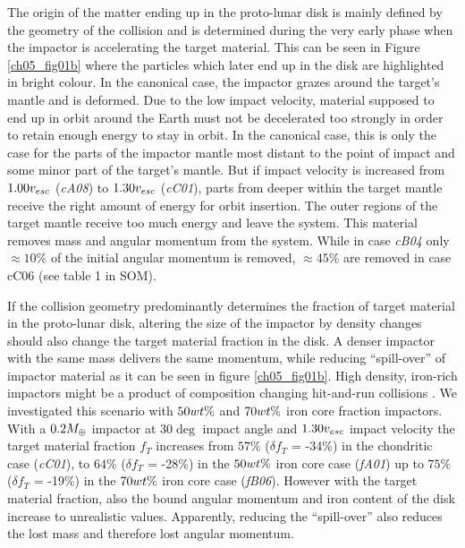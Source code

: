 The origin of the matter ending up in the proto-lunar disk is mainly defined by the geometry of the collision and is determined during the very early phase when the impactor is accelerating the target material. This can be seen in Figure \ref{ch05_fig01b} where the particles which later end up in the disk are highlighted in bright colour. In the canonical case, the impactor grazes around the target's mantle and is deformed. Due to the low impact velocity, material supposed to end up in orbit around the Earth must not be decelerated too strongly in order to retain enough energy to stay in orbit. In the canonical case, this is only the case for the parts of the impactor mantle most distant to the point of impact and some minor part of the target's mantle. But if impact velocity is increased from $1.00 v_{esc}$ (\emph{cA08}) to $1.30 v_{esc}$ (\emph{cC01}), parts from deeper within the target mantle receive the right amount of energy for orbit insertion. The outer regions of the target mantle receive too much energy and leave the system. This material removes mass and angular momentum from the system. While in case \emph{cB04} only $\approx 10\%$ of the initial angular momentum is removed, $\approx 45\%$ are removed in case cC06 (see table 1 in SOM).

If the collision geometry predominantly determines the fraction of target material in the proto-lunar disk, altering the size of the impactor by density changes should also change the target material fraction in the disk. A denser impactor with the same mass delivers the same momentum, while reducing “spill-over” of impactor material as it can be seen in figure \ref{ch05_fig01b}. High density, iron-rich impactors might be a product of composition changing hit-and-run collisions \citep{Asphaug:2010p3539}. We investigated this scenario with $50 wt\mathrm{\%}$ and $70 wt\mathrm{\%}$ iron core fraction impactors. With a $0.2 M_{\oplus}$ impactor at $30 \deg$ impact angle and $1.30 v_{esc}$ impact velocity the target material fraction $f_T$ increases from $57\%$ ($\delta f_{T}$ = -34\%) in the chondritic case (\emph{cC01}), to $64\%$ ($\delta f_{T}$ = -28\%) in the $50 wt\mathrm{\%}$ iron core case (\emph{fA01}) up to $75\%$ ($\delta f_{T}$ = -19\%) in the $70 wt\mathrm{\%}$ iron core case (\emph{fB06}). However with the target material fraction, also the bound angular momentum and iron content of the disk increase to unrealistic values. Apparently, reducing the “spill-over” also reduces the lost mass and therefore lost angular momentum. 


